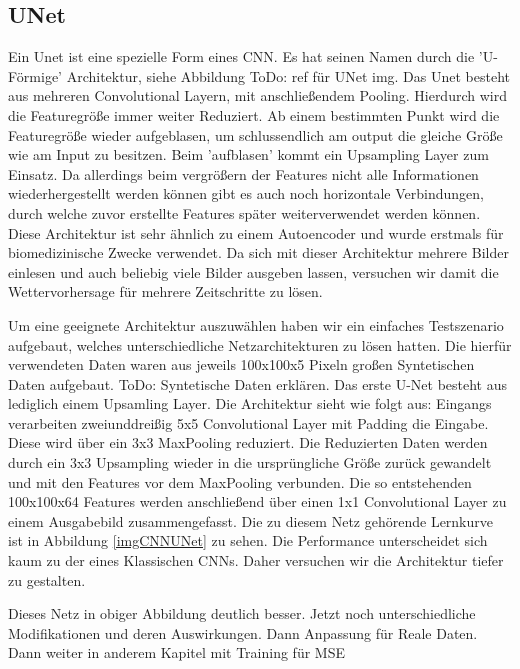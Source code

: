 \subsection{UNet}
\label{kapitelUNet}
Ein Unet ist eine spezielle Form eines CNN. Es hat seinen Namen durch die 'U-Förmige' Architektur, siehe Abbildung
ToDo: ref für UNet img.
Das Unet besteht aus mehreren Convolutional Layern, mit anschließendem Pooling. Hierdurch wird die Featuregröße immer weiter Reduziert. Ab einem bestimmten Punkt wird die Featuregröße wieder aufgeblasen, um schlussendlich am output die gleiche Größe wie am Input zu besitzen. Beim 'aufblasen' kommt ein Upsampling Layer zum Einsatz. Da allerdings beim vergrößern der Features nicht alle Informationen wiederhergestellt werden können gibt es auch noch horizontale Verbindungen, durch welche zuvor erstellte Features später weiterverwendet werden können.
Diese Architektur ist sehr ähnlich zu einem Autoencoder und wurde erstmals für biomedizinische Zwecke verwendet. Da sich mit dieser Architektur mehrere Bilder einlesen und auch beliebig viele Bilder ausgeben lassen, versuchen wir damit die Wettervorhersage für mehrere Zeitschritte zu lösen.

Um eine geeignete Architektur auszuwählen haben wir ein einfaches Testszenario aufgebaut, welches unterschiedliche Netzarchitekturen zu lösen hatten. Die hierfür verwendeten Daten waren aus jeweils 100x100x5 Pixeln großen Syntetischen Daten aufgebaut.
ToDo: Syntetische Daten erklären.
Das erste U-Net besteht aus lediglich einem Upsamling Layer. Die Architektur sieht wie folgt aus:
Eingangs verarbeiten zweiunddreißig 5x5 Convolutional Layer mit Padding die Eingabe. Diese wird über ein 3x3 MaxPooling reduziert. Die Reduzierten Daten werden durch ein 3x3 Upsampling wieder in die ursprüngliche Größe zurück gewandelt und mit den Features vor dem MaxPooling verbunden. Die so entstehenden 100x100x64 Features werden anschließend über einen 1x1 Convolutional Layer zu einem Ausgabebild zusammengefasst.
Die zu diesem Netz gehörende Lernkurve ist in Abbildung \ref{imgCNNUNet} zu sehen. Die Performance unterscheidet sich kaum zu der eines Klassischen CNNs. Daher versuchen wir die Architektur tiefer zu gestalten.

Dieses Netz in obiger Abbildung deutlich besser.
Jetzt noch unterschiedliche Modifikationen und deren Auswirkungen.
Dann Anpassung für Reale Daten.
Dann weiter in anderem Kapitel mit Training für MSE




